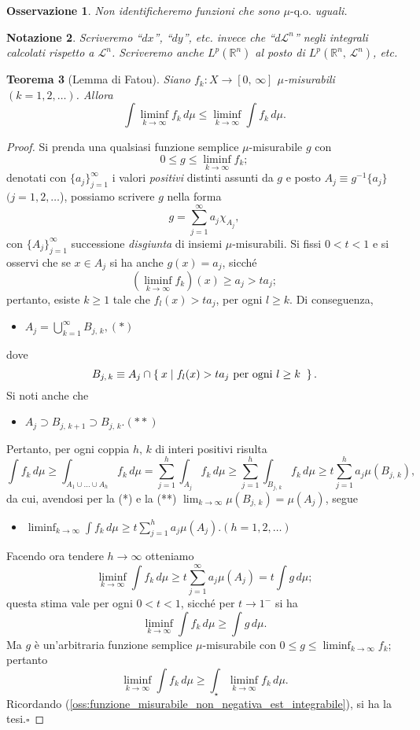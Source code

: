 \documentclass[a4paper,10pt,openright,oneside]{book}
\theoremstyle{theoremstyle}
\newtheorem{teorema}{Teorema}[section]
\theoremstyle{theoremstylewoheader}
\theoremstyle{theoremstyle}
\newtheorem{notazione}[teorema]{Notazione}
\newtheorem{osservazione}[teorema]{Osservazione}
\theoremstyle{proofsecstyle}
\theoremstyle{nonumberplain}
\newtheorem{proof}{Dim.}
\newcommand{\RR}{\ensuremath{\mathbb{R}}}
\newcommand{\Leb}{\ensuremath{\mathcal{L}}}
\newcommand{\qo}[1]{\ensuremath{#1\text{-q.o.}}}
\renewcommand{\qedsymbol}{\ensuremath{\square}}
\newcommand{\qed}{\unskip\nobreak\hfill\nobreak\hspace{.5em}\qedsymbol}
\newcommand{\mymath}[2]{\begin{itemize}%
  \item[]\hfill\hbox{}\ensuremath{\displaystyle #1}\hfill\ensuremath{\displaystyle #2}%
  \end{itemize}}
\begin{document}
\begin{osservazione}
\emph{Non} identificheremo funzioni che sono $\qo{\mu}$ uguali.
\end{osservazione}

\begin{notazione}
Scriveremo ``$dx$'', ``$dy$'', etc. invece che ``$d\Leb^n$'' negli integrali calcolati rispetto a $\Leb^n$. Scriveremo anche $L^p(\RR^n)$ al posto di $L^p(\RR^n,\, \Leb^n)$, etc.
\end{notazione}

\begin{teorema}[Lemma di Fatou]
\label{thm:lemma_fatou}
Siano $f_k : X \rightarrow [0,\, \infty]$ $\mu$-misurabili $(k = 1, 2, \ldots)$. Allora
\[
\int \liminf_{k \to \infty} f_k\, d\mu \le \liminf_{k \to \infty} \int f_k\, d\mu.
\]
\end{teorema}

\begin{proof}
Si prenda una qualsiasi funzione semplice $\mu$-misurabile $g$ con
\[
0 \le g \le \liminf_{k \to \infty} f_k;
\]
denotati con $\{a_j\}_{j=1}^\infty$ i valori \emph{positivi} distinti assunti da $g$ e posto $A_j \equiv g^{-1}\{a_j\}$ $(j = 1, 2, \ldots$), possiamo scrivere $g$ nella forma
\[
g = \sum_{j=1}^\infty a_j \chi_{A_j},
\] 
con $\{A_j\}_{j=1}^\infty$ successione \emph{disgiunta} di insiemi $\mu$-misurabili. Si fissi $0 < t < 1$ e si osservi che se $x \in A_j$ si ha anche $g(x) = a_j$, sicché
\[
\left(\liminf_{k \to \infty} f_k\right) (x) \ge a_j > ta_j;
\]
pertanto, esiste $k \ge 1$ tale che $f_l(x) > ta_j$, per ogni $l \ge k$. Di conseguenza, \mymath{A_j = \bigcup_{k=1}^\infty B_{j,\,k},}{(*)} dove
\[
B_{j,\,k} \equiv A_j \cap \Set{ x | f_l(x) > ta_j \text{ per ogni $l \ge k$ } }.
\]
Si noti anche che \mymath{A_j \supset B_{j,\,k+1} \supset B_{j,\,k}.}{(**)} Pertanto, per ogni coppia $h,\, k$ di interi positivi risulta
\[
\int f_k\, d\mu \ge \int_{A_1 \cup \ldots \cup A_h} f_k\, d\mu = \sum_{j=1}^h \int_{A_j} f_k\, d\mu
\ge \sum_{j=1}^h \int_{B_{j,\,k}} f_k\, d\mu \ge t \sum_{j=1}^h a_j \mu(B_{j,\,k}),
\]
da cui, avendosi per la (*) e la (**) $\lim_{k \to \infty} \mu(B_{j,\,k}) = \mu(A_j)$, segue \mymath{\liminf_{k \to \infty} \int f_k\, d\mu \ge t\sum_{j=1}^h a_j \mu(A_j).}{(h = 1, 2, \ldots)} Facendo ora tendere $h \to \infty$ otteniamo
\[
\liminf_{k \to \infty} \int f_k\, d\mu \ge t\sum_{j=1}^\infty a_j \mu(A_j) = t \int g\, d\mu;
\]
questa stima vale per ogni $0 < t < 1$, sicché per $t \to 1^-$ si ha
\[
\liminf_{k \to \infty} \int f_k\, d\mu \ge \int g\, d\mu.
\]
Ma $g$ è un'arbitraria funzione semplice $\mu$-misurabile con $0 \le g \le \liminf_{k \to \infty} f_k$; pertanto
\[
\liminf_{k \to \infty} \int f_k\, d\mu \ge \int_\star \liminf_{k \to \infty} f_k\, d\mu.
\]
Ricordando (\ref{oss:funzione_misurabile_non_negativa_est_integrabile}), si ha la tesi.\qed
\end{proof}
\end{document}
